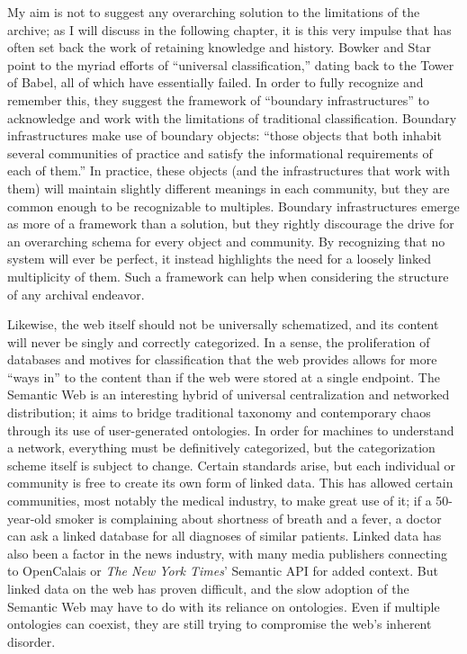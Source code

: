 My aim is not to suggest any overarching solution to the limitations of the archive; as I will discuss in the following chapter, it is this very impulse that has often set back the work of retaining knowledge and history. Bowker and Star point to the myriad efforts of ``universal classification,'' dating back to the Tower of Babel, all of which have essentially failed. In order to fully recognize and remember this, they suggest the framework of ``boundary infrastructures'' to acknowledge and work with the limitations of traditional classification. Boundary infrastructures make use of boundary objects: ``those objects that both inhabit several communities of practice and satisfy the informational requirements of each of them.''\autocite[297]{bowker_sorting_2000} In practice, these objects (and the infrastructures that work with them) will maintain slightly different meanings in each community, but they are common enough to be recognizable to multiples. Boundary infrastructures emerge as more of a framework than a solution, but they rightly discourage the drive for an overarching schema for every object and community. By recognizing that no system will ever be perfect, it instead highlights the need for a loosely linked multiplicity of them. Such a framework can help when considering the structure of any archival endeavor.

Likewise, the web itself should not be universally schematized, and its content will never be singly and correctly categorized. In a sense, the proliferation of databases and motives for classification that the web provides allows for more ``ways in'' to the content than if the web were stored at a single endpoint. %
The Semantic Web is an interesting hybrid of universal centralization and networked distribution; it aims to bridge traditional taxonomy and contemporary chaos through its use of user-generated ontologies. In order for machines to understand a network, everything must be definitively categorized, but the categorization scheme itself is subject to change. Certain standards arise, but each individual or community is free to create its own form of linked data. This has allowed certain communities, most notably the medical industry, to make great use of it; if a 50-year-old smoker is complaining about shortness of breath and a fever, a doctor can ask a linked database for all diagnoses of similar patients. Linked data has also been a factor in the news industry, with many media publishers connecting to OpenCalais or \emph{The New  York Times}' Semantic API for added context. But linked data on the web has proven difficult, and the slow adoption of the Semantic Web may have to do with its reliance on ontologies. Even if multiple ontologies can coexist, they are still trying to compromise the web's inherent disorder.

